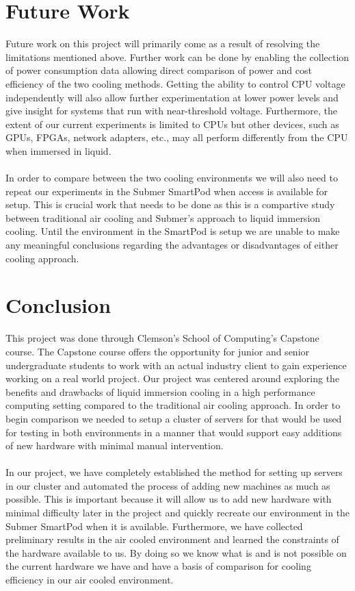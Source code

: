 \documentclass[sigconf]{acmart}
\begin{document}
\section{Future Work}
Future work on this project will primarily come as a result of resolving the limitations mentioned above. Further work can be done by enabling the collection of power consumption data allowing direct comparison of power and cost efficiency of the two cooling methods. Getting the ability to control CPU voltage independently will also allow further experimentation at lower power levels and give insight for systems that run with near-threshold voltage. Furthermore, the extent of our current experiments is limited to CPUs but other devices, such as GPUs, FPGAs, network adapters, etc., may all perform differently from the CPU when immersed in liquid. 
\\\\
In order to compare between the two cooling environments we will also need to repeat our experiments in the Submer SmartPod when access is available for setup. This is crucial work that needs to be done as this is a compartive study between traditional air cooling and Submer's approach to liquid immersion cooling. Until the environment in the SmartPod is setup we are unable to make any meaningful conclusions regarding the advantages or disadvantages of either cooling approach. 

\section{Conclusion}
This project was done through Clemson's School of Computing's Capstone course. The Capstone course offers the opportunity for junior and senior undergraduate students to work with an actual industry client to gain experience working on a real world project. Our project was centered around exploring the benefits and drawbacks of liquid immersion cooling in a high performance computing setting compared to the traditional air cooling approach. In order to begin comparison we needed to setup a cluster of servers for that would be used for testing in both environments in a manner that would support easy additions of new hardware with minimal manual intervention.
\\\\
In our project, we have completely established the method for setting up servers in our cluster and automated the process of adding new machines as much as possible. This is important because it will allow us to add new hardware with minimal difficulty later in the project and quickly recreate our environment in the Submer SmartPod when it is available. Furthermore, we have collected preliminary results in the air cooled environment and learned the constraints of the hardware available to us. By doing so we know what is and is not possible on the current hardware we have and have a basis of comparison for cooling efficiency in our air cooled environment.
\end{document}
